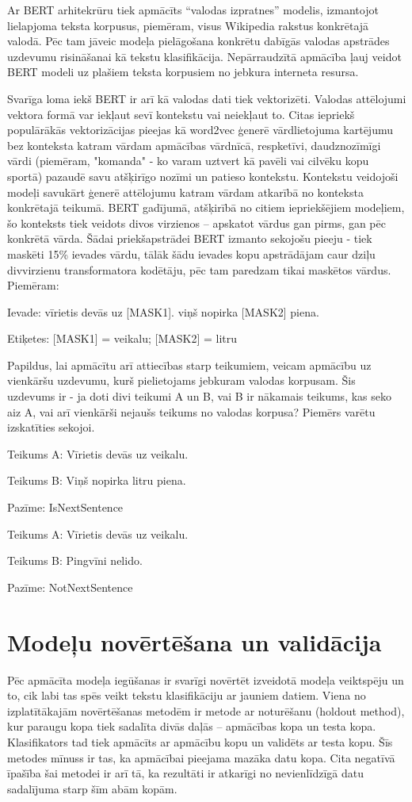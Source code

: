 Ar BERT arhitekrūru tiek apmācīts “valodas izpratnes” modelis, izmantojot lielapjoma teksta korpusus, piemēram, visus Wikipedia rakstus konkrētajā valodā. Pēc tam jāveic modeļa pielāgošana konkrētu dabīgās valodas apstrādes uzdevumu risināšanai kā tekstu klasifikācija. Nepārraudzītā apmācība ļauj veidot BERT modeli uz plašiem teksta korpusiem no jebkura interneta resursa.

Svarīga loma iekš BERT ir arī kā valodas dati tiek vektorizēti. Valodas attēlojumi vektora formā var iekļaut sevī kontekstu vai neiekļaut to. Citas iepriekš populārākās vektorizācijas pieejas kā word2vec ģenerē vārdlietojuma kartējumu bez konteksta katram vārdam apmācības vārdnīcā, respketīvi, daudznozīmīgi vārdi (piemēram, "komanda" - ko varam uztvert kā pavēli vai cilvēku kopu sportā) pazaudē savu atšķirīgo nozīmi un patieso kontekstu. Kontekstu veidojoši modeļi savukārt ģenerē attēlojumu katram vārdam atkarībā no konteksta konkrētajā teikumā. BERT gadījumā, atšķirībā no citiem iepriekšējiem modeļiem, šo konteksts tiek veidots divos virzienos – apskatot vārdus gan pirms, gan pēc konkrētā vārda. Šādai priekšapstrādei BERT izmanto sekojošu pieeju -  tiek maskēti 15\% ievades vārdu, tālāk šādu ievades kopu apstrādājam caur dziļu divvirzienu transformatora kodētāju, pēc tam paredzam tikai maskētos vārdus. Piemēram:

Ievade: vīrietis devās uz [MASK1]. viņš nopirka [MASK2] piena.

Etiķetes: [MASK1] = veikalu; [MASK2] = litru

Papildus, lai apmācītu arī attiecības starp teikumiem, veicam apmācību uz vienkāršu uzdevumu, kurš pielietojams jebkuram valodas korpusam. Šis uzdevums ir - ja doti divi teikumi A un B, vai B ir nākamais teikums, kas seko aiz A, vai arī vienkārši nejaušs teikums no valodas korpusa? Piemērs varētu izskatīties sekojoi.

Teikums A: Vīrietis devās uz veikalu.

Teikums B: Viņš nopirka litru piena.

Pazīme: IsNextSentence

Teikums A: Vīrietis devās uz veikalu.

Teikums B: Pingvīni nelido.

Pazīme: NotNextSentence

\section{Modeļu novērtēšana un validācija}
Pēc apmācīta modeļa iegūšanas ir svarīgi novērtēt izveidotā modeļa veiktspēju un to, cik labi tas spēs veikt tekstu klasifikāciju ar jauniem datiem. 
Viena no izplatītākajām novērtēšanas metodēm ir metode ar noturēšanu (holdout method), kur paraugu kopa tiek sadalīta divās daļās – apmācības kopa un testa kopa. Klasifikators tad tiek apmācīts ar apmācību kopu un validēts ar testa kopu. Šīs metodes mīnuss ir tas, ka apmācībai pieejama mazāka datu kopa. Cita negatīvā īpašība šai metodei ir arī tā, ka rezultāti ir atkarīgi no nevienlīdzīgā datu sadalījuma starp šīm abām kopām.


